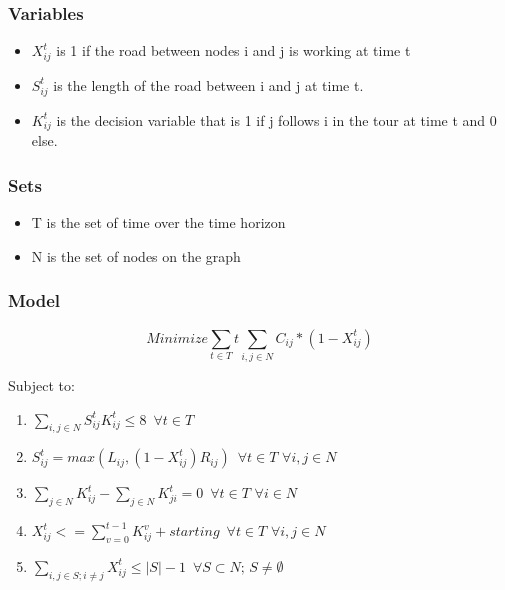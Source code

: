 \documentclass{article}
\begin{document}
	\subsubsection{Variables}
	\begin{itemize}
		\item $X_{ij}^t$ is 1 if the road between nodes i and j is working at time t
		\item $S_{ij}^t$ is the length of the road between i and j at time t. 
		\item $K_{ij}^t$ is the decision variable that is 1 if j follows i in the tour at time t and 0 else.
		
	\end{itemize}
	\subsubsection{Sets}
	\begin{itemize}
		\item T is the set of time over the time horizon
		\item N is the set of nodes on the graph
	\end{itemize}
	\subsubsection{Model}
	$$	Minimize \sum_{t \in T} t \sum_{i,j \in N} C_{ij}*(1-X_{ij}^t) $$
	
	Subject to:
	\begin{enumerate}[label=(\arabic*), leftmargin=*, itemsep=0.4ex, before={\everymath{\displaystyle}}]%
		\item $\sum_{i,j \in N} S_{ij}^t K_{ij}^t \leq 8 \hspace{6pt} \forall t\in T$
		\item $S_{ij}^t = max(L_{ij},(1-X_{ij}^t)R_{ij}) \hspace{6pt} \forall t\in T \hspace{4pt} \forall i,j \in N$
		\item $\sum_{j \in N} K_{ij}^t - \sum_{j \in N} K_{ji}^t = 0 \hspace{6pt} \forall t\in T \hspace{4pt} \forall i \in N$
		\item $X_{ij}^t <= \sum_{v=0}^{t-1} K_{ij}^v + starting \hspace{6pt} \forall t\in T \hspace{4pt} \forall i,j \in N$
		\item $\sum_{i,j \in S; i\neq j} X_{ij}^t \leq |S|-1 \hspace{6pt} \forall S \subset N; \hspace{2pt} S \neq \emptyset$
	\end{enumerate}
\end{document}
